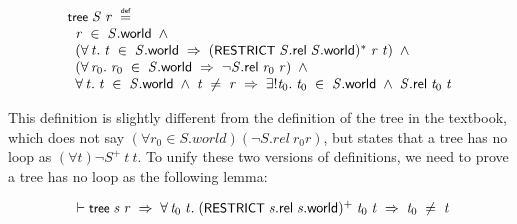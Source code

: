 \documentclass{report}
\renewcommand{\HOLConst}[1]{{\textsf{\upshape\small #1}}}
\newenvironment{holmath}{\begin{displaymath}\begin{array}{l}}{\end{array}\end{displaymath}\ignorespacesafterend}
\begin{document}
\begin{holmath}
  \HOLConst{tree}\;\HOLFreeVar{S}\;\HOLFreeVar{r}\;\HOLSymConst{\HOLTokenDefEquality{}}\\
\;\;\HOLFreeVar{r}\;\HOLSymConst{\HOLTokenIn{}}\;\HOLFreeVar{S}.\HOLFieldName{world}\;\HOLSymConst{\HOLTokenConj{}}\\
\;\;(\HOLSymConst{\HOLTokenForall{}}\HOLBoundVar{t}.\;\HOLBoundVar{t}\;\HOLSymConst{\HOLTokenIn{}}\;\HOLFreeVar{S}.\HOLFieldName{world}\;\HOLSymConst{\HOLTokenImp{}}\;(\HOLConst{RESTRICT}\;\HOLFreeVar{S}.\HOLFieldName{rel}\;\HOLFreeVar{S}.\HOLFieldName{world})\HOLSymConst{\HOLTokenSupStar{}}\;\HOLFreeVar{r}\;\HOLBoundVar{t})\;\HOLSymConst{\HOLTokenConj{}}\\
\;\;(\HOLSymConst{\HOLTokenForall{}}\HOLBoundVar{r\sb{\mathrm{0}}}.\;\HOLBoundVar{r\sb{\mathrm{0}}}\;\HOLSymConst{\HOLTokenIn{}}\;\HOLFreeVar{S}.\HOLFieldName{world}\;\HOLSymConst{\HOLTokenImp{}}\;\HOLSymConst{\HOLTokenNeg{}}\HOLFreeVar{S}.\HOLFieldName{rel}\;\HOLBoundVar{r\sb{\mathrm{0}}}\;\HOLFreeVar{r})\;\HOLSymConst{\HOLTokenConj{}}\\
\;\;\HOLSymConst{\HOLTokenForall{}}\HOLBoundVar{t}.\;\HOLBoundVar{t}\;\HOLSymConst{\HOLTokenIn{}}\;\HOLFreeVar{S}.\HOLFieldName{world}\;\HOLSymConst{\HOLTokenConj{}}\;\HOLBoundVar{t}\;\HOLSymConst{\HOLTokenNotEqual{}}\;\HOLFreeVar{r}\;\HOLSymConst{\HOLTokenImp{}}\;\HOLSymConst{\HOLTokenUnique{}}\HOLBoundVar{t\sb{\mathrm{0}}}.\;\HOLBoundVar{t\sb{\mathrm{0}}}\;\HOLSymConst{\HOLTokenIn{}}\;\HOLFreeVar{S}.\HOLFieldName{world}\;\HOLSymConst{\HOLTokenConj{}}\;\HOLFreeVar{S}.\HOLFieldName{rel}\;\HOLBoundVar{t\sb{\mathrm{0}}}\;\HOLBoundVar{t}
\end{holmath}

This definition is slightly different from the definition of the tree in the textbook, which does not say $(\forall r_0 \in S.world)(\lnot S.rel \ r_0 r)$, but states that a tree has no loop as $(\forall t) \lnot S^+ \ t \ t$. To unify these two versions of definitions, we need to prove a tree has no loop as the following lemma:

\begin{holmath}
  \ensuremath{\HOLTokenTurnstile}\HOLConst{tree}\;\HOLFreeVar{s}\;\HOLFreeVar{r}\;\HOLSymConst{\HOLTokenImp{}}\;\HOLSymConst{\HOLTokenForall{}}\HOLBoundVar{t\sb{\mathrm{0}}}\;\HOLBoundVar{t}.\;(\HOLConst{RESTRICT}\;\HOLFreeVar{s}.\HOLFieldName{rel}\;\HOLFreeVar{s}.\HOLFieldName{world})\HOLSymConst{\HOLTokenSupPlus{}}\;\HOLBoundVar{t\sb{\mathrm{0}}}\;\HOLBoundVar{t}\;\HOLSymConst{\HOLTokenImp{}}\;\HOLBoundVar{t\sb{\mathrm{0}}}\;\HOLSymConst{\HOLTokenNotEqual{}}\;\HOLBoundVar{t}
\end{holmath}
\end{document}
